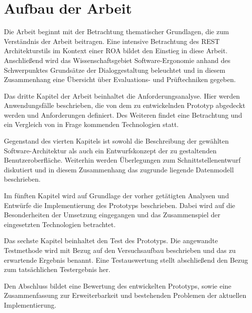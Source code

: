 \section{Aufbau der Arbeit}

Die Arbeit beginnt mit der Betrachtung thematischer Grundlagen, die zum Verständnis der Arbeit beitragen. Eine intensive Betrachtung des \acf{REST} Architekturstils im Kontext einer \acf{ROA} bildet den Einstieg in diese Arbeit. Anschließend wird das Wissenschaftsgebiet Software-Ergonomie anhand des Schwerpunktes Grundsätze der Dialoggestaltung beleuchtet und in diesem Zusammenhang eine Übersicht über Evaluations- und Prüftechniken gegeben.

Das dritte Kapitel der Arbeit beinhaltet die Anforderungsanalyse. Hier werden Anwendungsfälle beschrieben, die von dem zu entwickelnden Prototyp abgedeckt werden und Anforderungen definiert. Des Weiteren findet eine Betrachtung und ein Vergleich von in Frage kommenden Technologien statt.

Gegenstand des vierten Kapitels ist sowohl die Beschreibung der gewählten Software-Architektur als auch ein Entwurfskonzept der zu gestaltenden Benutzeroberfläche. Weiterhin werden Überlegungen zum Schnittstellenentwurf diskutiert und in diesem Zusammenhang das zugrunde liegende Datenmodell beschrieben.

Im fünften Kapitel wird auf Grundlage der vorher getätigten Analysen und Entwürfe die Implementierung des Prototyps beschrieben. Dabei wird auf die Besonderheiten der Umsetzung eingegangen und das Zusammenspiel der eingesetzten Technologien betrachtet. 

Das sechste Kapitel beinhaltet den Test des Prototyps. Die angewandte Testmethode wird mit Bezug auf den Versuchsaufbau beschrieben und das zu erwartende Ergebnis benannt. Eine Testauswertung stellt abschließend den Bezug zum tatsächlichen Testergebnis her.

Den Abschluss bildet eine Bewertung des entwickelten Prototyps, sowie eine Zusammenfassung zur Erweiterbarkeit und bestehenden Problemen der aktuellen Implementierung.